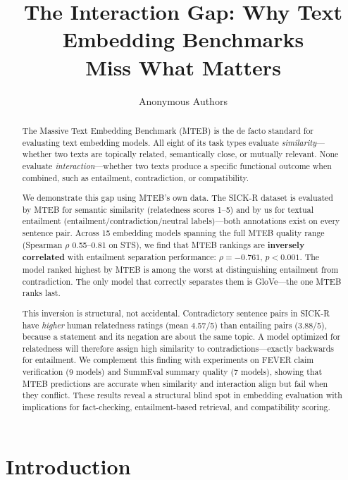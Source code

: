 \documentclass{article}
\title{%
  \textbf{The Interaction Gap: Why Text Embedding Benchmarks\\Miss What Matters}
}
\author{
  Anonymous Authors
}
\date{}
\begin{document}
\maketitle

\begin{abstract}
The Massive Text Embedding Benchmark (MTEB) is the de facto standard for evaluating text embedding models. All eight of its task types evaluate \emph{similarity}---whether two texts are topically related, semantically close, or mutually relevant. None evaluate \emph{interaction}---whether two texts produce a specific functional outcome when combined, such as entailment, contradiction, or compatibility.

We demonstrate this gap using MTEB's own data. The SICK-R dataset is evaluated by MTEB for semantic similarity (relatedness scores 1--5) and by us for textual entailment (entailment/contradiction/neutral labels)---both annotations exist on every sentence pair. Across 15 embedding models spanning the full MTEB quality range (Spearman $\rho$ 0.55--0.81 on STS), we find that MTEB rankings are \textbf{inversely correlated} with entailment separation performance: $\rho = -0.761$, $p < 0.001$. The model ranked highest by MTEB is among the worst at distinguishing entailment from contradiction. The only model that correctly separates them is GloVe---the one MTEB ranks last.

This inversion is structural, not accidental. Contradictory sentence pairs in SICK-R have \emph{higher} human relatedness ratings (mean 4.57/5) than entailing pairs (3.88/5), because a statement and its negation are about the same topic. A model optimized for relatedness will therefore assign high similarity to contradictions---exactly backwards for entailment. We complement this finding with experiments on FEVER claim verification (9 models) and SummEval summary quality (7 models), showing that MTEB predictions are accurate when similarity and interaction align but fail when they conflict. These results reveal a structural blind spot in embedding evaluation with implications for fact-checking, entailment-based retrieval, and compatibility scoring.
\end{abstract}

\section{Introduction}
\label{sec:introduction}
\end{document}

